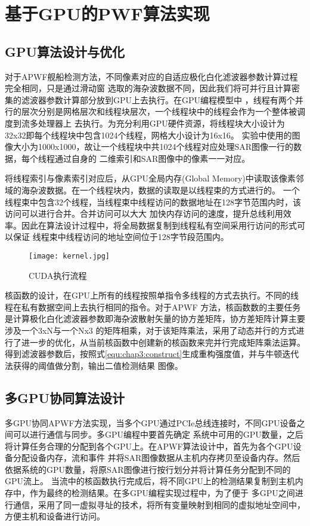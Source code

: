\section{基于GPU的PWF算法实现}

\subsection{GPU算法设计与优化}
 对于APWF舰船检测方法，不同像素对应的自适应极化白化滤波器参数计算过程完全相同，只是通过滑动窗
 选取的海杂波数据不同，因此我们将可并行且计算密集的滤波器参数计算部分放到GPU上去执行。在GPU编程模型中
 ，线程有两个并行的层次分别是网格层次和线程块层次，一个线程块中的线程会作为一个整体被调度到流多处理器上
 去执行。为充分利用GPU硬件资源，将线程块大小设计为32x32即每个线程块中包含1024个线程，网格大小设计为16x16。
 实验中使用的图像大小为1000x1000，故让一个线程块中共1024个线程对应处理SAR图像一行的数据，每个线程通过自身的
 二维索引和SAR图像中的像素一一对应。

 将线程索引与像素索引对应后，从GPU全局内存(Global Memory)中读取该像素邻域的海杂波数据。在一个线程块内，数据的读取是以线程束的方式进行的。
 一个线程束中包含32个线程，当线程束中线程访问的数据地址在128字节范围内时，该访问可以进行合并。合并访问可以大大
 加快内存访问的速度，提升总线利用效率。因此在算法设计过程中，将全局数据复制到线程私有空间采用行访问的形式可以保证
 线程束中线程访问的地址空间位于128字节段范围内。

  \begin{figure}[H] %
    \centering
    \texttt{[image: kernel.jpg]}
    \caption{CUDA执行流程}
    \label{fig:chap3:kernel}
  \end{figure}

 核函数的设计，在GPU上所有的线程按照单指令多线程的方式去执行。不同的线程在私有数据空间上去执行相同的指令。对于APWF
 方法，核函数数的主要任务是计算极化白化滤波器参数即海杂波散射矢量的协方差矩阵，协方差矩阵计算主要涉及一个3xN与一个Nx3
 的矩阵相乘，对于该矩阵乘法，采用了动态并行的方式进行了进一步的优化，从当前核函数中创建新的核函数来完并行完成矩阵乘法运算。
 得到滤波器参数后，按照式\ref{equ:chap3:construct}生成重构强度值，并与牛顿迭代法获得的阈值做分割，输出二值检测结果
 图像。
\subsection{多GPU协同算法设计}

 多GPU协同APWF方法实现，当多个GPU通过PCIe总线连接时，不同GPU设备之间可以进行通信与同步。多GPU编程中要首先确定
 系统中可用的GPU数量，之后将计算任务合理的分配到各个GPU上。在APWF算法设计中，首先为各个GPU设备分配设备内存，流和事件
 并将SAR图像数据从主机内存拷贝至设备内存。然后依据系统的GPU数量，将原SAR图像进行按行划分并将计算任务分配到不同的GPU流上。
 当流中的核函数执行完成后，将不同GPU上的检测结果复制到主机内存中，作为最终的检测结果。在多GPU编程实现过程中，为了便于
 多GPU之间进行通信，采用了同一虚拟寻址的技术，将所有变量映射到相同的虚拟地址空间中，方便主机和设备进行访问。

